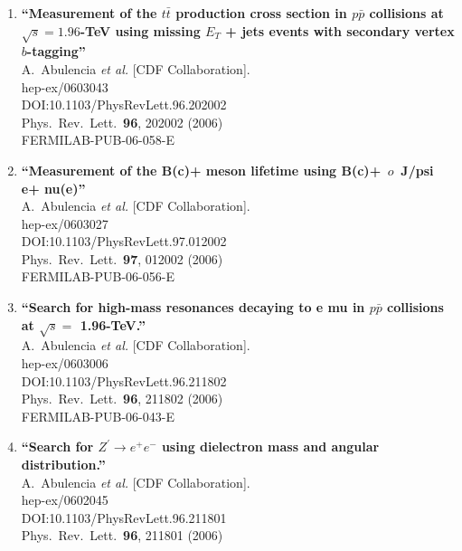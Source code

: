 \documentclass{article}
\begin{document}
\begin{enumerate}
\item%
{\bf ``Measurement of the $t\bar{t}$ production cross section in $p\bar{p}$ collisions at $\sqrt{s} = 1.96$-TeV using missing $E_T$ + jets events with secondary vertex $b$-tagging''}
  \\{}A.~Abulencia {\it et al.} [CDF Collaboration].
  \\{}hep-ex/0603043
  \\{}DOI:10.1103/PhysRevLett.96.202002
  \\{}Phys.\ Rev.\ Lett.\  {\bf 96}, 202002 (2006)
  \\{}FERMILAB-PUB-06-058-E
\item%
{\bf ``Measurement of the B(c)+ meson lifetime using B(c)+ $\,	o\,$ J/psi e+ nu(e)''}
  \\{}A.~Abulencia {\it et al.} [CDF Collaboration].
  \\{}hep-ex/0603027
  \\{}DOI:10.1103/PhysRevLett.97.012002
  \\{}Phys.\ Rev.\ Lett.\  {\bf 97}, 012002 (2006)
  \\{}FERMILAB-PUB-06-056-E
\item%
{\bf ``Search for high-mass resonances decaying to e mu in $p\bar{p}$ collisions at $\sqrt{s} =$ 1.96-TeV.''}
  \\{}A.~Abulencia {\it et al.} [CDF Collaboration].
  \\{}hep-ex/0603006
  \\{}DOI:10.1103/PhysRevLett.96.211802
  \\{}Phys.\ Rev.\ Lett.\  {\bf 96}, 211802 (2006)
  \\{}FERMILAB-PUB-06-043-E
\item%
{\bf ``Search for $Z^\prime \to e^+ e^-$ using dielectron mass and angular distribution.''}
  \\{}A.~Abulencia {\it et al.} [CDF Collaboration].
  \\{}hep-ex/0602045
  \\{}DOI:10.1103/PhysRevLett.96.211801
  \\{}Phys.\ Rev.\ Lett.\  {\bf 96}, 211801 (2006)

\end{enumerate}
\end{document}

